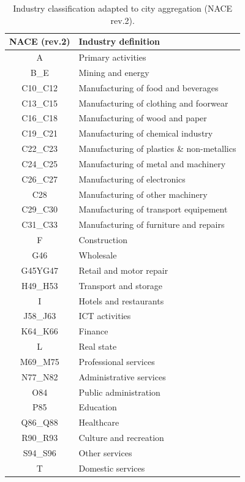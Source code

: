 \documentclass[
  10pt,
  twocolumn]{aft}
\begin{document}
\begin{table}[!ht]
\centering\begingroup\fontsize{10}{12}\selectfont
\vspace{-0.25cm}
\begin{tabular}[t]{cl}
\toprule
NACE (rev.2) & Industry definition\\
\midrule
A & Primary activities\\
B\_E & Mining and energy\\
C10\_C12 & Manufacturing of food and beverages\\
C13\_C15 & Manufacturing of clothing and foorwear\\
C16\_C18 & Manufacturing of wood and paper\\
C19\_C21 & Manufacturing of chemical industry\\
C22\_C23 & Manufacturing of plastics \& non-metallics\\
C24\_C25 & Manufacturing of metal and machinery\\
C26\_C27 & Manufacturing of electronics\\
C28 & Manufacturing of other machinery\\
C29\_C30 & Manufacturing of transport equipement\\
C31\_C33 & Manufacturing of furniture and repairs\\
F & Construction\\
G46 & Wholesale\\
G45YG47 & Retail and motor repair\\
H49\_H53 & Transport and storage\\
I & Hotels and restaurants\\
J58\_J63 & ICT activities\\
K64\_K66 & Finance\\
L & Real state\\
M69\_M75 & Professional services\\
N77\_N82 & Administrative services\\
O84 & Public administration\\
P85 & Education\\
Q86\_Q88 & Healthcare\\
R90\_R93 & Culture and recreation\\
S94\_S96 & Other services\\
T & Domestic services\\
\bottomrule
\end{tabular}
\endgroup{}
\vspace{-0.25cm}
\caption{Industry classification adapted to city aggregation (NACE rev.2).}
\end{table}
\end{document}
